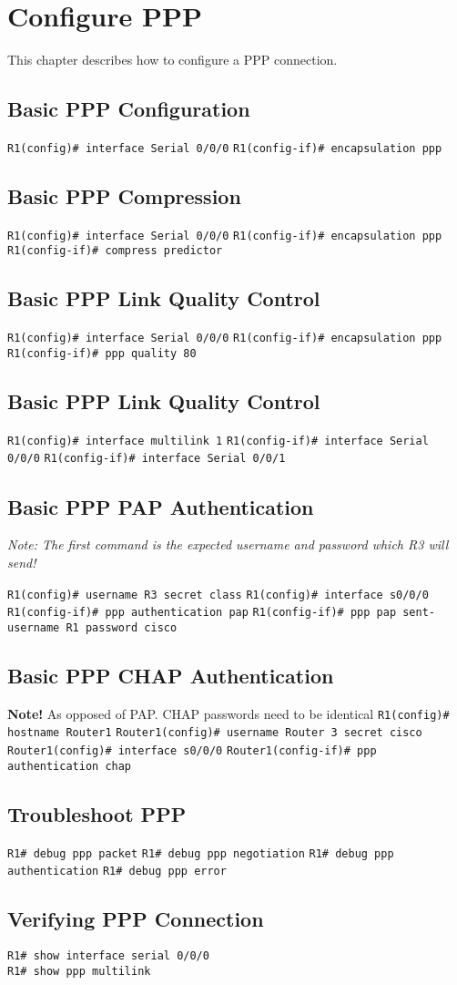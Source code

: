 \section{Configure PPP}
This chapter describes how to configure a PPP connection.
\subsection{Basic PPP Configuration}
\verb!R1(config)# interface Serial 0/0/0!
\verb!R1(config-if)# encapsulation ppp!
\subsection{Basic PPP Compression}
\verb!R1(config)# interface Serial 0/0/0!
\verb!R1(config-if)# encapsulation ppp!
\verb!R1(config-if)# compress predictor!
\subsection{Basic PPP Link Quality Control}
\verb!R1(config)# interface Serial 0/0/0!
\verb!R1(config-if)# encapsulation ppp!
\verb!R1(config-if)# ppp quality 80!
\subsection{Basic PPP Link Quality Control}
\verb!R1(config)# interface multilink 1!
\verb!R1(config-if)# interface Serial 0/0/0!
\verb!R1(config-if)# interface Serial 0/0/1!

\subsection{Basic PPP PAP Authentication}
\textit{Note: The first command is the expected username and password which R3 will send!}

\verb!R1(config)# username R3 secret class!
\verb!R1(config)# interface s0/0/0!
\verb!R1(config-if)# ppp authentication pap!
\verb!R1(config-if)# ppp pap sent-username R1 password cisco!

\subsection{Basic PPP CHAP Authentication}
\textbf{Note!} As opposed of PAP. CHAP passwords need to be identical
\verb!R1(config)# hostname Router1!
\verb!Router1(config)# username Router 3 secret cisco!
\verb!Router1(config)# interface s0/0/0!
\verb!Router1(config-if)# ppp authentication chap!

\subsection{Troubleshoot PPP}
\verb!R1# debug ppp packet!
\verb!R1# debug ppp negotiation!
\verb!R1# debug ppp authentication!
\verb!R1# debug ppp error!

\subsection{Verifying PPP Connection}
\verb!R1# show interface serial 0/0/0! \\
\verb!R1# show ppp multilink!
